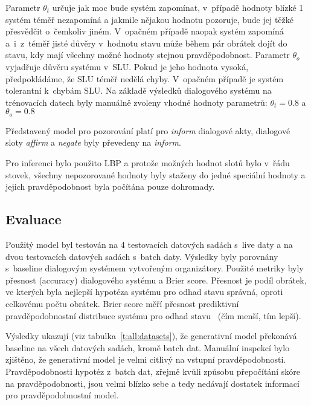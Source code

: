 Parametr $\theta_t$ určuje jak moc bude systém zapomínat, v~případě hodnoty blízké 1 systém téměř nezapomíná a jakmile nějakou hodnotu pozoruje, bude jej těžké přesvědčit o~čemkoliv jiném.
V~opačném případě naopak systém zapomíná a~i~z~téměř jisté důvěry v~hodnotu stavu může během pár obrátek dojít do stavu, kdy mají všechny možné hodnoty stejnou pravděpodobnost.
Parametr $\theta_o$ vyjadřuje důvěru systému v~SLU.
Pokud je jeho hodnota vysoká, předpokládáme, že SLU téměř nedělá chyby.
V~opačném případě je systém tolerantní k~chybám SLU.
Na základě výsledků dialogového systému na trénovacích datech byly manuálně zvoleny vhodné hodnoty parametrů: $\theta_t = 0.8$ a $\theta_o = 0.8$

Představený model pro pozorování platí pro \emph{inform} dialogové akty, dialogové sloty \emph{affirm} a \emph{negate} byly převedeny na \emph{inform}.

Pro inferenci bylo použito LBP a protože možných hodnot slotů bylo v~řádu stovek, všechny nepozorované hodnoty byly staženy do jedné speciální hodnoty a jejich pravděpodobnost byla počítána pouze dohromady.

\subsection{Evaluace}

Použitý model byl testován na 4 testovacích datových sadách s~live daty a na dvou testovacích datových sadách s~batch daty.
Výsledky byly porovnány s~baseline dialogovým systémem vytvořeným organizátory.
Použité metriky byly přesnost (accuracy) dialogového systému a Brier score.
Přesnost je podíl obrátek, ve kterých byla nejlepší hypotéza systému pro odhad stavu správná, oproti celkovému počtu obrátek.
Brier score měří přesnost prediktivní pravděpodobnostní distribuce systému pro odhad stavu~\cite{brier1950verification} (čím menší, tím lepší).

Výsledky ukazují (viz tabulka~\ref{t:all:datasets}), že generativní model překonává baseline na všech datových sadách, kromě batch dat.
Manuální inspekcí bylo zjištěno, že generativní model je velmi citlivý na vstupní pravděpodobnosti.
Pravděpodobnosti hypotéz z~batch dat, zřejmě kvůli způsobu přepočítání skóre na pravděpodobnosti, jsou velmi blízko sebe a tedy nedávají dostatek informací pro pravděpodobnostní model.


